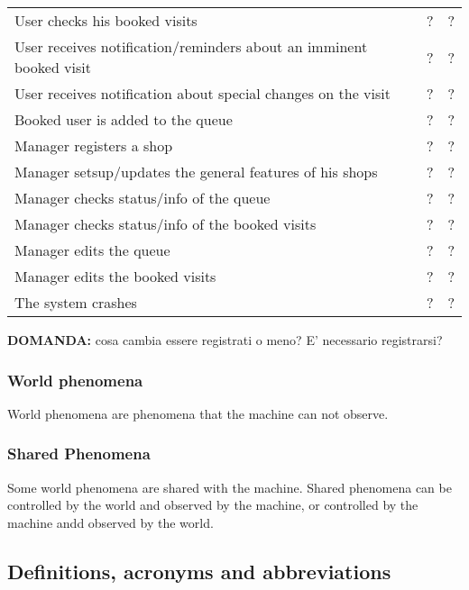 \begin{tabular}{|l|c|c|}
    User checks his booked visits & ? & ? \\
    User receives notification/reminders about an imminent booked visit & ? & ? \\
    User receives notification about special changes on the visit & ? & ? \\
    Booked user is added to the queue & ? & ? \\ %
    \hline
    Manager registers a shop & ? & ? \\
    Manager setsup/updates the general features of his shops & ? & ? \\
    Manager checks status/info of the queue & ? & ? \\
    Manager checks status/info of the booked visits & ? & ? \\
    Manager edits the queue & ? & ? \\
    Manager edits the booked visits & ? & ? \\
    \hline
    The system crashes & ? & ? \\
    \hline
\end{tabular}

\textbf{DOMANDA:} cosa cambia essere registrati o meno? E' necessario registrarsi?

\subsubsection{World phenomena}
\label{subsubsect:worldphenomena}

World phenomena are phenomena that the machine can not observe.

\subsubsection{Shared Phenomena}
\label{subsubsect:sharedphenomena}

Some world phenomena are shared with the machine.
Shared phenomena can be controlled by the world and observed by the machine, or controlled by the machine andd observed by the world.

\subsection{Definitions, acronyms and abbreviations}
\label{subsect:definitionsacronymsabbreviations}

